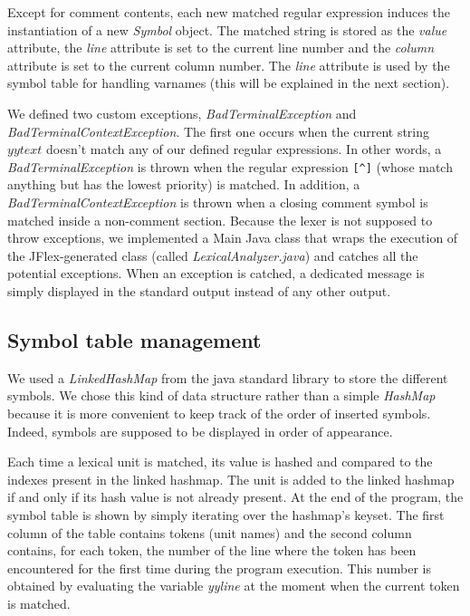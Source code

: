 \documentclass[12pt]{report}
\begin{document}
Except for comment contents, each new matched regular expression induces the instantiation of a new \textit{Symbol}
object.  The matched string is stored as the \textit{value} attribute, the \textit{line} attribute is set to the current
line number and the \textit{column} attribute is set to the current column number. The \textit{line} attribute is used
by the symbol table for handling varnames (this will be explained in the next section).


We defined two custom exceptions, \textit{BadTerminalException} and \textit{BadTerminalContextException}. The first one occurs when the current string
$yytext$ doesn't match any of our defined regular expressions. In other words, a \textit{BadTerminalException} is thrown when the regular expression
\texttt{[\textasciicircum]} (whose match anything but has the lowest priority) is matched. In addition, a
\textit{BadTerminalContextException} is thrown when a closing comment symbol is matched inside a non-comment section.
Because the lexer is not supposed to throw exceptions, we implemented a Main Java class that wraps the execution of the
JFlex-generated class (called \textit{LexicalAnalyzer.java}) and catches all the potential exceptions. When an exception
is catched, a dedicated message is simply displayed in the standard output instead of any other output.

\subsection{Symbol table management}

We used a \textit{LinkedHashMap} from the java standard library to store the different symbols. We chose this kind of data structure rather than
a simple \textit{HashMap} because it is more convenient to keep track of the order of inserted symbols. Indeed, symbols are supposed to be
displayed in order of appearance.


Each time a lexical unit is matched, its value is hashed and compared to the indexes present in the linked hashmap. The unit is added to the linked hashmap 
if and only if its hash value is not already present. At the end of the program, the symbol table is shown by simply iterating over the hashmap's keyset. 
The first column of the table contains tokens (unit names) and the second column contains, for each token, the number of the line where the token has
been encountered for the first time during the program execution. This number is obtained by evaluating the variable \textit{yyline} at the moment when
the current token is matched.
\end{document}
